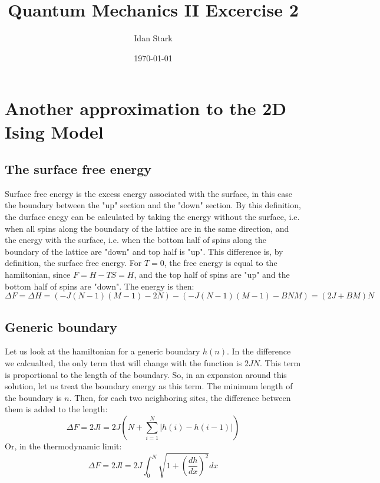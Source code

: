 \documentclass{article}
\title{Quantum Mechanics II Excercise 2}
\author{Idan Stark}
\date{\today}
\begin{document}
\maketitle

\section{Another approximation to the 2D Ising Model}
\subsection{The surface free energy}
Surface free energy is the excess energy associated with the surface, in this case the boundary between the "up" section and the "down" section. By this definition, the durface enegy can be calculated by taking the energy without the surface, i.e. when all spins along the boundary of the lattice are in the same direction, and the energy with the surface, i.e. when the bottom half of spins along the boundary of the lattice are "down" and top half is "up". This difference is, by definition, the surface free energy.
\newline
For $T = 0$, the free energy is equal to the hamiltonian, since $F = H - TS = H$, and the top half of spins are "up" and the bottom half of spins are "down". The energy is then:
\begin{equation}
    \Delta F = \Delta H = \left(
        -J (N-1)(M-1) - 2N
    \right) - \left(
        -J (N-1)(M-1) - BNM
    \right) = (2J + BM)N 
\end{equation}
\subsection{Generic boundary}
Let us look at the hamiltonian for a generic boundary $h(n)$. In the difference we calcualted, the only term that will change with the function is $2JN$. This term is proportional to the length of the boundary. So, in an expansion around this solution, let us treat the boundary energy as this term. The minimum length of the boundary is $n$. Then, for each two neighboring sites, the difference between them is added to the length:
\begin{equation}
    \Delta F = 2Jl = 2J \left(
        N + \sum_{i=1}^{N}|h(i) - h(i-1)|
    \right)
\end{equation}
Or, in the thermodynamic limit:
\begin{equation}
    \Delta F = 2Jl = 2J\int_0^N \sqrt{1 + \left(\frac{dh}{dx}\right)^2}dx
\end{equation}
\end{document}
